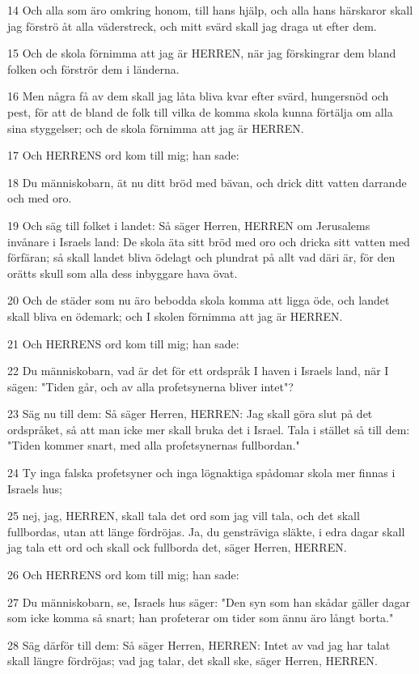 \par 14 Och alla som äro omkring honom, till hans hjälp, och alla hans härskaror skall jag förströ åt alla väderstreck, och mitt svärd skall jag draga ut efter dem.
\par 15 Och de skola förnimma att jag är HERREN, när jag förskingrar dem bland folken och förströr dem i länderna.
\par 16 Men några få av dem skall jag låta bliva kvar efter svärd, hungersnöd och pest, för att de bland de folk till vilka de komma skola kunna förtälja om alla sina styggelser; och de skola förnimma att jag är HERREN.
\par 17 Och HERRENS ord kom till mig; han sade:
\par 18 Du människobarn, ät nu ditt bröd med bävan, och drick ditt vatten darrande och med oro.
\par 19 Och säg till folket i landet: Så säger Herren, HERREN om Jerusalems invånare i Israels land: De skola äta sitt bröd med oro och dricka sitt vatten med förfäran; så skall landet bliva ödelagt och plundrat på allt vad däri är, för den orätts skull som alla dess inbyggare hava övat.
\par 20 Och de städer som nu äro bebodda skola komma att ligga öde, och landet skall bliva en ödemark; och I skolen förnimma att jag är HERREN.
\par 21 Och HERRENS ord kom till mig; han sade:
\par 22 Du människobarn, vad är det för ett ordspråk I haven i Israels land, när I sägen: "Tiden går, och av alla profetsynerna bliver intet"?
\par 23 Säg nu till dem: Så säger Herren, HERREN: Jag skall göra slut på det ordspråket, så att man icke mer skall bruka det i Israel. Tala i stället så till dem: "Tiden kommer snart, med alla profetsynernas fullbordan."
\par 24 Ty inga falska profetsyner och inga lögnaktiga spådomar skola mer finnas i Israels hus;
\par 25 nej, jag, HERREN, skall tala det ord som jag vill tala, och det skall fullbordas, utan att länge fördröjas. Ja, du gensträviga släkte, i edra dagar skall jag tala ett ord och skall ock fullborda det, säger Herren, HERREN.
\par 26 Och HERRENS ord kom till mig; han sade:
\par 27 Du människobarn, se, Israels hus säger: "Den syn som han skådar gäller dagar som icke komma så snart; han profeterar om tider som ännu äro långt borta."
\par 28 Säg därför till dem: Så säger Herren, HERREN: Intet av vad jag har talat skall längre fördröjas; vad jag talar, det skall ske, säger Herren, HERREN.


